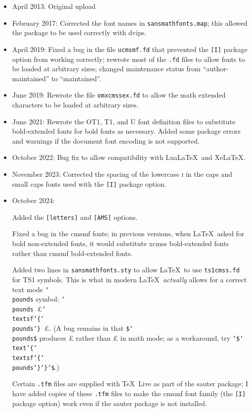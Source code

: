\documentclass{amsart}
\begin{document}
\begin{itemize}[leftmargin=*]
\item
April 2013: Original upload

\item
February 2017: Corrected the font names in \texttt{sansmathfonts.map}; this allowed the package to be used correctly with \textsf{dvips}.  

\item
April 2019: Fixed a bug in the file \texttt{ucmsmf.fd} that prevented the \texttt{[I]} package option from working correctly; rewrote most of the \texttt{.fd} files to allow fonts to be loaded at arbitrary sizes; changed maintenance status from ``author-maintained'' to ``maintained''.

\item
June 2019: Rewrote the file \texttt{omxcmssex.fd} to allow the math extended characters to be loaded at arbitrary sizes.

\item
June 2021: Rewrote the OT1, T1, and U font definition files to substitute bold-extended fonts for bold fonts as necessary. Added some package errors and warnings if the document font encoding is not supported.

\item
October 2022: Bug fix to allow compatibility with Lua\LaTeX\ and Xe\LaTeX.

\item
November 2023: Corrected the spacing of the lowercase \textsc{i} in the caps and small caps fonts used with the \texttt{[I]} package option.

\item October 2024: 

Added the \texttt{[letters]} and \texttt{[AMS]} options. 

Fixed a bug in the \textsf{cmsmf} fonts; in previous versions, when \LaTeX\ asked for bold non-extended fonts, it would substitute \textsf{xcmss} bold-extended fonts rather than \textsf{cmsmf} bold-extended fonts.

Added two lines in \texttt{sansmathfonts.sty} to allow \LaTeX\ to use \texttt{ts1cmss.fd} for TS1 symbols. This is what in modern \LaTeX\ \emph{actually} allows for a correct text mode \texttt{\char`\\pounds} symbol:  \texttt{\char`\\pounds}~\pounds \space \texttt{\char`\\textsf\char`\{\char`\\pounds\char`\}}~\textsf{\pounds}. (A bug remains in that \texttt{\$\char`\\pounds\$} produces $\pounds$ rather than \textsf{\pounds} in math mode; as a workaround, try \texttt{\char`\$\char`\\text\char`\{\char`\\textsf\char`\{\char`\\pounds\char`\}\char`\}\char`\$}.)

Certain \texttt{.tfm} files are supplied with \TeX\ Live as part of the \textsf{sauter} package; I have added copies of these \texttt{.tfm} files to make the \textsf{cmsmf} font family (the \texttt{[I]} package option) work even if the \textsf{sauter} package is not installed.

\end{itemize}
\end{document}

